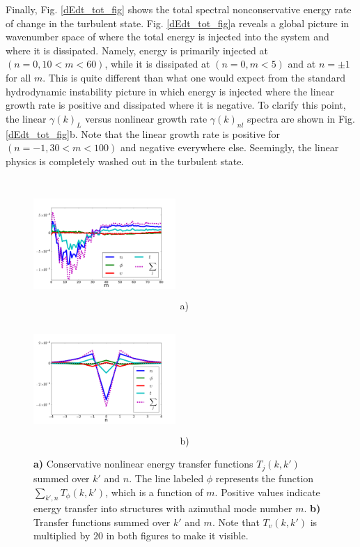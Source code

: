 \documentclass[12pt]{article}
\begin{document}
Finally, Fig. \ref{dEdt_tot_fig} shows the total spectral nonconservative energy rate of change in the turbulent state. Fig. \ref{dEdt_tot_fig}a reveals a global picture in wavenumber space of
where the total energy is injected into the system and where it is dissipated. Namely, energy is primarily injected at $(n=0, 10<m<60)$, while it is dissipated at $(n=0, m<5)$ and at $n=\pm 1$
for all $m$. This is quite different than what one would expect from the standard hydrodynamic instability picture in which energy is injected where the linear growth rate is positive and dissipated
where it is negative. To clarify this point, the linear $\gamma(k)_L$ versus nonlinear growth rate $\gamma(k)_{nl}$ spectra are shown in Fig. \ref{dEdt_tot_fig}b. Note that the linear growth rate
is positive for $(n=-1, 30<m<100)$ and negative everywhere else. Seemingly, the linear physics is completely washed out in the turbulent state. \\

\begin{figure}
\includegraphics[width=0.48\textwidth,height=50mm]{T_m}~a)
\hfil
\includegraphics[width=0.48\textwidth,height=50mm]{T_n}~b)
\hfil
\caption{\textbf{a)} Conservative nonlinear energy transfer functions $T_j(k,k')$ summed over $k'$ and $n$. The line labeled $\phi$ represents the function $\sum_{k',n} T_\phi(k,k')$,
which is a function of $m$. 
Positive values indicate energy transfer into structures with azimuthal mode number $m$.
\textbf{b)} Transfer functions summed over $k'$ and $m$. Note that $T_v(k,k')$ is multiplied by $20$ in both figures to make it visible.}
\label{conservative_transfers}
\end{figure}
\end{document}
